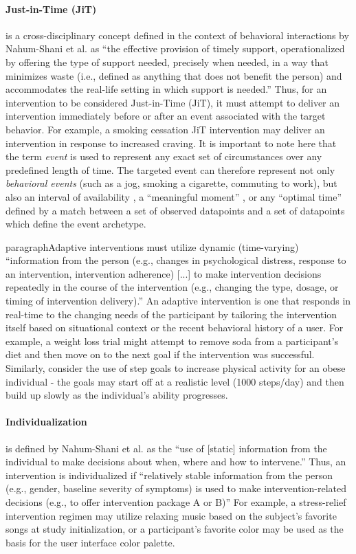 \documentclass[runningheads,a4paper]{llncs}
\begin{document}
\paragraph{Just-in-Time (JiT)} is a cross-disciplinary concept defined in the context of behavioral interactions by Nahum-Shani et al. as “the effective provision of timely support, operationalized by offering the type of support needed, precisely when needed, in a way that minimizes waste (i.e., defined as anything that does not benefit the person) and accommodates the real-life setting in which support is needed.” \cite{nahum2014}
Thus, for an intervention to be considered Just-in-Time (JiT), it must attempt to deliver an intervention immediately before or after an event associated with the target behavior. 
For example, a smoking cessation JiT intervention may deliver an intervention in response to increased craving.
It is important to note here that the term \emph{event} is used to represent any exact set of circumstances over any predefined length of time.
The targeted event can therefore represent not only \emph{behavioral events} (such as a jog, smoking a cigarette, commuting to work), but also an interval of availability \cite{???}, a “meaningful moment” \cite{???}, or any “optimal time” \cite{???} defined by a match between a set of observed datapoints and a set of datapoints which define the event archetype.

paragraph{Adaptive} interventions must utilize dynamic (time-varying) “information from the person (e.g., changes in psychological distress, response to an intervention, intervention adherence) [...] to make intervention decisions repeatedly in the course of the intervention (e.g., changing the type, dosage, or timing of intervention delivery).” \cite{nahum2014}
An adaptive intervention is one that responds in real-time to the changing needs of the participant by tailoring the intervention itself based on situational context or the recent behavioral history of a user. 
For example, a weight loss trial might attempt to remove soda from a participant’s diet and then move on to the next goal if the intervention was successful.
Similarly, consider the use of step goals to increase physical activity for an obese individual - the goals may start off at a realistic level (1000 steps/day) and then build up slowly as the individual’s ability progresses.

\paragraph{Individualization} is defined by Nahum-Shani et al. as the “use of [static] information from the individual to make decisions about when, where and how to intervene.” \cite{nahum2014}
Thus, an intervention is individualized if “relatively stable information from the person (e.g., gender, baseline severity of symptoms) is used to make intervention-related decisions (e.g., to offer intervention package A or B)” \cite{nahum2014}
For example, a stress-relief intervention regimen may utilize relaxing music based on the subject’s favorite songs at study initialization, or a participant’s favorite color may be used as the basis for the user interface color palette.
\end{document}
